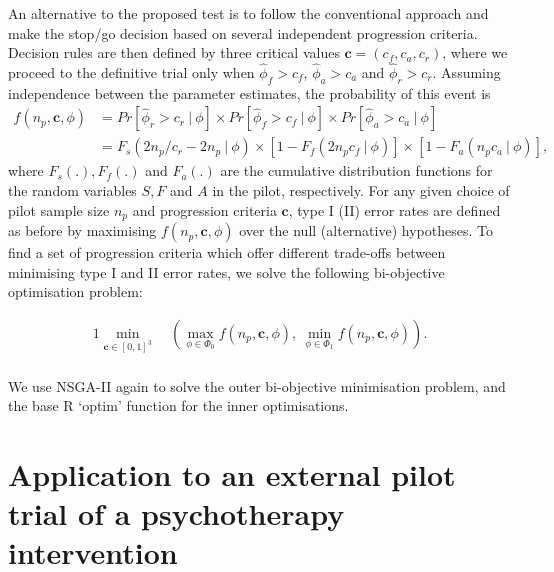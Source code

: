 \documentclass[AMA,STIX1COL]{WileyNJD-v2}
\begin{document}
An alternative to the proposed test is to follow the conventional approach and make the stop/go decision based on several independent progression criteria. Decision rules are then defined by three critical values $\mathbf{c} = (c_f, c_a, c_r)$, where we proceed to the definitive trial only when $\hat{\phi}_f > c_f$, $\hat{\phi}_a > c_a$ and $\hat{\phi}_r > c_r$. Assuming independence between the parameter estimates, the probability of this event is
\begin{align*}
f(n_p, \mathbf{c}, \phi) &= Pr[\hat{\phi}_r > c_r ~ | ~ \phi] \times Pr[ \hat{\phi}_f > c_f ~ | ~ \phi] \times Pr[ \hat{\phi}_a > c_a ~ | ~ \phi] \\
&= F_s( 2n_p/c_r - 2n_p ~ | ~ \phi) \times [1-F_f(2n_p c_f ~ | ~ \phi)] \times [1-F_a(n_p c_a ~ | ~ \phi)],
\end{align*}
where $F_s(.), F_f(.)$ and $F_a(.)$ are the cumulative distribution functions for the random variables $S, F$ and $A$ in the pilot, respectively. For any given choice of pilot sample size $n_p$ and progression criteria $\mathbf{c}$, type I (II) error rates are defined as before by maximising $f(n_p, \mathbf{c}, \phi)$ over the null (alternative) hypotheses. To find a set of progression criteria which offer different trade-offs between minimising type I and II error rates, we solve the following bi-objective optimisation problem:

\begin{alignat*}{1}
\min_{\mathbf{c} \in [0,1]^3} ~ & \left( \max_{\phi \in \Phi_0} f(n_p, \mathbf{c}, \phi) , ~ \min_{\phi \in \Phi_1} f(n_p, \mathbf{c}, \phi) \right). \\
\end{alignat*}

We use NSGA-II again to solve the outer bi-objective minimisation problem, and the base R `optim' function for the inner optimisations.

\section{Application to an external pilot trial of a psychotherapy intervention}\label{sec:example}
\end{document}
